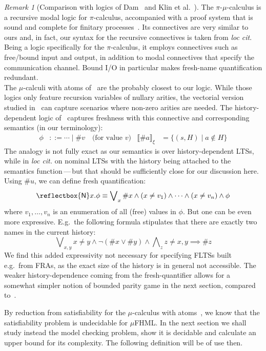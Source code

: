 \documentclass[10pt,a4paper]{article}
\theoremstyle{definition}
\theoremstyle{remark}
\newtheorem{remark}[theorem]{Remark}
\newcommand\new[0]{\reflectbox{\ensuremath{\mathsf{N}}}}
\newcommand\fresh[1]{\new #1.}
\newcommand\fhml[0]{$\mu$FHML}
\newcommand\sem[2][\xi]{\llbracket#2\rrbracket_{#1}}
\begin{document}
\begin{remark}[Comparison with logics of Dam~\cite{Dam03} and Klin et al.~\cite{KlinL19,KlinHD}]
  The $\pi$-$\mu$-calculus is a recursive modal logic for $\pi$-calculus, accompanied with a proof system that is sound and complete for finitary processes~\cite{Dam03}.
  Its connectives are very similar to ours and, in fact, our syntax for the recursive connectives is taken from \emph{loc cit}. Being a logic specifically for the $\pi$-calculus, it employs connectives such as free/bound input and output, in addition to modal connectives that specify the communication channel. Bound I/O in particular makes fresh-name quantification redundant. 
  \\
  The $\mu$-calculi with atoms of~\cite{KlinL19,KlinHD} are the probably closest to our logic. While those logics only feature recursion variables of nullary arities, the vectorial version studied in~\cite{KlinL19} can capture scenarios where non-zero arities are needed. The history-dependent logic of~\cite{KlinHD} captures freshness with this connective and corresponding semantics (in our terminology):
  \begin{align*}
\phi &::= \cdots \mid \#v\quad \text{(for value $v$)}
    &
\sem{\#a} &= \{(s,H)\mid a\notin H\}
  \end{align*}      
The analogy is not fully exact as our semantics is over history-dependent LTSs, while in \emph{loc cit.} on nominal LTSs with the history being attached to the semantics function\,---\,but that should be sufficiently close for our discussion here. Using $\#u$, we can define fresh quantification:
  \[
\fresh{x}\phi \equiv \bigvee\nolimits_x\#x\land(x\neq v_1)\land\cdots\land(x\neq v_n)\land\phi
\]
where $v_1,\dots,v_n$ is an enumeration of all (free) values in $\phi$.
But one can be even more expressive. E.g.\ the following formula stipulates that there are exactly two names in the current history:
\[
  \bigvee\nolimits_{x,y}x\neq y\land\lnot(\#x\lor\#y)\land
  \bigwedge\nolimits_{z}z\neq x,y\implies\#z
\]
We find this added expressivity not necessary for specifying FLTSs built e.g.\ from FRAs, as the exact size of the history is in general not accessible. The weaker history-dependence coming from the fresh-quantifier allows for a somewhat simpler notion of bounded parity game in the next section, compared to~\cite{KlinHD}. 
\end{remark}

By reduction from satisfiability for the $\mu$-calculus with atoms~\cite{KlinL19}, we know that the satisfiability problem is undecidable for \fhml. In the next section we shall study instead the model checking problem, show it is decidable and calculate an upper bound for its complexity.
The following definition will be of use then.
\end{document}
